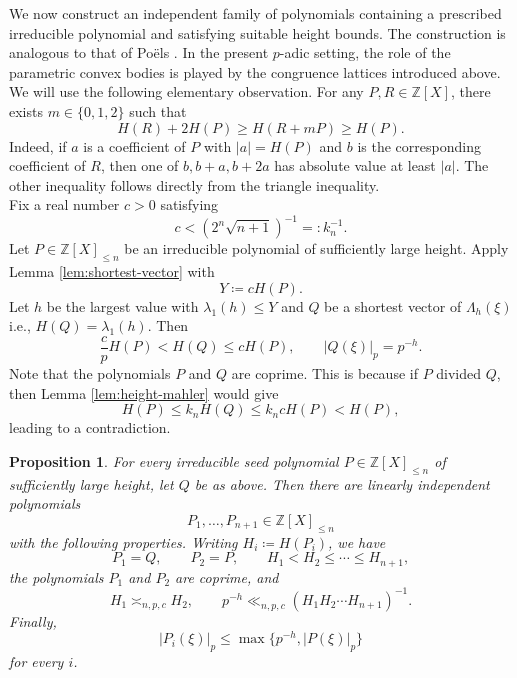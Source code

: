 \documentclass[12pt,reqno]{amsart}
\newtheorem{proposition}[theorem]{Proposition}
\theoremstyle{definition}
\theoremstyle{remark}
\newcommand{\Z}{\mathbb Z}
\begin{document}
We now construct an independent family of polynomials containing a prescribed irreducible polynomial and satisfying suitable height bounds. The construction is analogous to that of Po\"els \cite[Lemma~4.1]{PoelsWirsing}. In the present $p$-adic setting, the role of the parametric convex bodies is played by the congruence lattices introduced above.\\

We will use the following elementary observation. For any
$P,R\in\Z[X]$, there exists $m\in\{0,1,2\}$ such that
\begin{equation}\label{eq:bounded-adjustment}
H(R)+2H(P) \geq H(R+mP)\geq H(P).
\end{equation}
Indeed, if $a$ is a coefficient of $P$ with $|a|=H(P)$ and $b$ is the
corresponding coefficient of $R$, then one of $b,b+a,b+2a$ has absolute value
at least $|a|$. The other inequality follows directly from the triangle inequality.\\

Fix a real number $c>0$ satisfying
$$
 c< (2^n\sqrt{n+1})^{-1} =: k_n^{-1}.
$$
Let $P\in\Z[X]_{\leq n}$ be an irreducible polynomial of sufficiently large height. Apply Lemma \ref{lem:shortest-vector} with
$$
Y\coloneqq cH(P).
$$
Let $h$ be the largest value with $\lambda_1(h)\leq Y$ and $Q$ be a shortest vector of $\Lambda_h(\xi)$ i.e., $H(Q)=\lambda_1(h)$. Then
$$
\frac{c}{p}H(P)<H(Q)\leq cH(P),
\qquad |Q(\xi)|_p=p^{-h}.
$$
Note that the polynomials $P$ and $Q$ are coprime. This is because if $P$ divided $Q$, then Lemma \ref{lem:height-mahler} would give
$$
H(P)\leq k_nH(Q)\leq k_ncH(P)<H(P),
$$
leading to a contradiction.\\

\begin{proposition}\label{prop:family}
For every irreducible seed polynomial $P\in\Z[X]_{\leq n}$ of sufficiently
large height, let $Q$ be as above. Then there are linearly independent polynomials
$$
P_1,\ldots,P_{n+1}\in\Z[X]_{\leq n}
$$
with the following properties. Writing $H_i\coloneqq H(P_i)$, we have
$$
P_1=Q,
\qquad P_2=P,
\qquad H_1<H_2\leq\cdots\leq H_{n+1},
$$
the polynomials $P_1$ and $P_2$ are coprime, and
$$
H_1\asymp_{n,p,c}H_2,
\qquad
p^{-h}\ll_{n,p,c}(H_1H_2\cdots H_{n+1})^{-1}.
$$
Finally,
$$
|P_i(\xi)|_p
\leq\max\{p^{-h},|P(\xi)|_p\}
$$
for every $i$.
\end{proposition}
\end{document}
